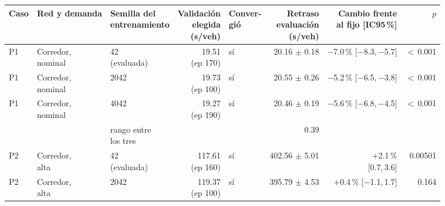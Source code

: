 \begin{table}[H]
\centering
\scriptsize
\setlength{\tabcolsep}{3pt}
\begin{tabular}{lllrlrrr}
\toprule
Caso & Red y demanda & \makecell{Semilla del\\entrenamiento} & \makecell{Validación\\elegida\\(s/veh)} & \makecell{Conver-\\gió} & \makecell{Retraso\\evaluación\\(s/veh)} & \makecell{Cambio frente\\al fijo [IC95\,\%]} & $p$ \\
\midrule
P1 & \makecell[l]{Corredor,\\{}nominal} & \makecell[l]{42\\{}(evaluada)} & \makecell[r]{19.51\\{}(ep 170)} & sí & \makecell[r]{20.16\\{}$\pm$ 0.18} & \makecell[r]{$-$7.0\,\%\\{}[$-$8.3,\,$-$5.7]} & $<$\,0.001 \\
P1 & \makecell[l]{Corredor,\\{}nominal} & 2042 & \makecell[r]{19.73\\{}(ep 100)} & sí & \makecell[r]{20.55\\{}$\pm$ 0.26} & \makecell[r]{$-$5.2\,\%\\{}[$-$6.5,\,$-$3.8]} & $<$\,0.001 \\
P1 & \makecell[l]{Corredor,\\{}nominal} & 4042 & \makecell[r]{19.27\\{}(ep 190)} & sí & \makecell[r]{20.46\\{}$\pm$ 0.19} & \makecell[r]{$-$5.6\,\%\\{}[$-$6.8,\,$-$4.5]} & $<$\,0.001 \\
 & & \makecell[l]{rango entre\\{}los tres} & & & 0.39 & & \\
P2 & \makecell[l]{Corredor,\\{}alta} & \makecell[l]{42\\{}(evaluada)} & \makecell[r]{117.61\\{}(ep 160)} & sí & \makecell[r]{402.56\\{}$\pm$ 5.01} & \makecell[r]{+2.1\,\%\\{}[0.7,\,3.6]} & 0.00501 \\
P2 & \makecell[l]{Corredor,\\{}alta} & 2042 & \makecell[r]{119.37\\{}(ep 100)} & sí & \makecell[r]{395.79\\{}$\pm$ 4.53} & \makecell[r]{+0.4\,\%\\{}[$-$1.1,\,1.7]} & 0.164 \\

\end{tabular}
\end{table}
